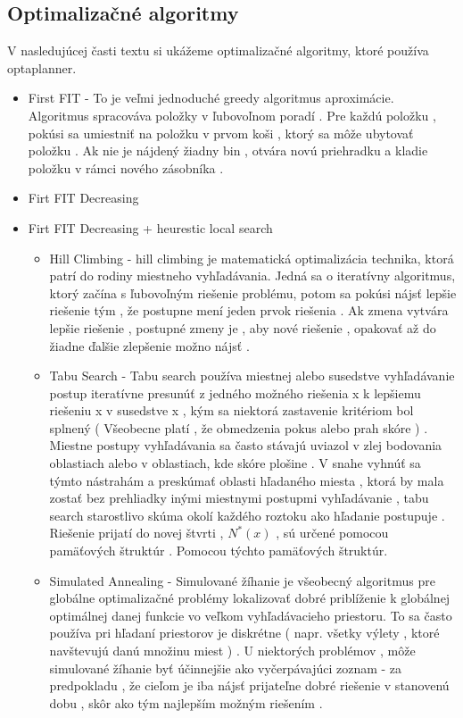 \subsection{Optimalizačné algoritmy}
V nasledujúcej časti textu si ukážeme optimalizačné algoritmy, ktoré používa optaplanner.
\begin{itemize}
\item First FIT - To je veľmi jednoduché greedy algoritmus aproximácie. Algoritmus spracováva položky v ľubovoľnom poradí . Pre každú položku , pokúsi sa umiestniť na položku v prvom koši , ktorý sa môže ubytovať položku . Ak nie je nájdený žiadny bin , otvára novú priehradku a kladie položku v rámci nového zásobníka .

\item Firt FIT Decreasing
\item Firt FIT Decreasing + heurestic local search

\begin{itemize}
\item Hill Climbing - hill climbing je matematická optimalizácia technika, ktorá patrí do rodiny miestneho vyhľadávania. Jedná sa o iteratívny algoritmus, ktorý začína s ľubovoľným riešenie problému, potom sa pokúsi nájsť lepšie riešenie tým , že postupne mení jeden prvok riešenia . Ak zmena vytvára lepšie riešenie , postupné zmeny je , aby nové riešenie , opakovať až do žiadne ďalšie zlepšenie možno nájsť . \cite{algobook}




\item Tabu Search - Tabu search používa miestnej alebo susedstve vyhľadávanie postup iteratívne presunúť z jedného možného riešenia x k lepšiemu riešeniu x  v susedstve x , kým sa niektorá zastavenie kritériom bol splnený ( Všeobecne platí , že obmedzenia pokus alebo prah skóre ) . Miestne postupy vyhľadávania sa často stávajú uviazol v zlej bodovania oblastiach alebo v oblastiach, kde skóre plošine . V snahe vyhnúť sa týmto nástrahám a preskúmať oblasti hľadaného miesta , ktorá by mala zostať bez prehliadky inými miestnymi postupmi vyhľadávanie , tabu search starostlivo skúma okolí každého roztoku ako hľadanie postupuje . Riešenie prijatí do novej štvrti , $N ^ * ( x )$ , sú určené pomocou pamäťových štruktúr . Pomocou týchto pamäťových štruktúr.

\item Simulated Annealing - Simulované žíhanie je všeobecný algoritmus pre globálne optimalizačné problémy lokalizovať dobré priblíženie k globálnej optimálnej danej funkcie vo veľkom vyhľadávacieho priestoru. To sa často používa pri hľadaní priestorov je diskrétne ( napr. všetky výlety , ktoré navštevujú danú množinu miest ) . U niektorých problémov , môže simulované žíhanie byť účinnejšie ako vyčerpávajúci zoznam - za predpokladu , že cieľom je iba nájsť prijateľne dobré riešenie v stanovenú dobu , skôr ako tým najlepším možným riešením .

\end{itemize}

\end{itemize}


